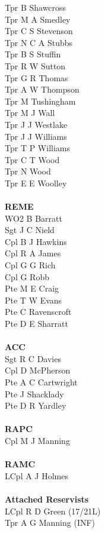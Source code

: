 \begin{multicols}{2}
  Tpr B Shawcross \\
  Tpr M A Smedley \\
  Tpr C S Stevenson \\
  Tpr N C A Stubbs \\
  Tpr B S Stuffin \\
  Tpr R W Sutton \\
  Tpr G R Thomas \\
  Tpr A W Thompson \\
  Tpr M Tushingham \\
  Tpr M J Wall \\
  Tpr J J Westlake \\
  Tpr J J Williams \\
  Tpr T P Williams \\
  Tpr C T Wood \\
  Tpr N Wood \\
  Tpr E E Woolley \\
  \\
  \textbf{REME} \\
  WO2 B Barratt \\
  Sgt J C Nield \\
  Cpl B J Hawkins \\
  Cpl R A James \\
  Cpl G G Rich \\
  Cpl G Robb \\
  Pte M E Craig \\
  Pte T W Evans \\
  Pte C Ravenscroft \\
  Pte D E Sharratt \\
  \\
  \textbf{ACC} \\
  Sgt R C Davies \\
  Cpl D McPherson \\
  Pte A C Cartwright \\
  Pte J Shacklady \\
  Pte D R Yardley \\
  \\
  \textbf{RAPC} \\
  Cpl M J Manning \\
  \\
  \textbf{RAMC} \\
  LCpl A J Holmes \\
  \\
  \textbf{Attached Reservists} \\
  LCpl R D Green (17/21L) \\
  Tpr A G Manning (INF) \\

\end{multicols}
